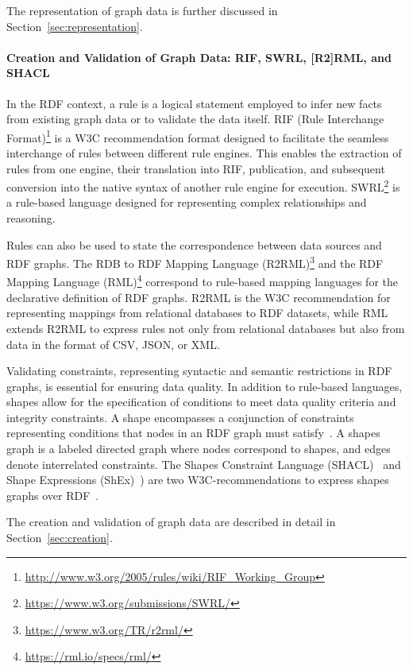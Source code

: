 \documentclass[a4paper,USenglish]{tgdk-v2021}
\newcommand{\myurl}[1]{\footnote{\url{#1}}}
\newcommand{\arxivonly}[1]{}
\begin{document}
The representation of graph data is further discussed in Section~\ref{sec:representation}.

\paragraph*{Creation and Validation of Graph Data: RIF, SWRL, [R2]RML, and SHACL}

In the RDF context, a rule is a logical statement employed to infer new facts from existing graph data or to validate the data itself.
RIF (Rule Interchange Format)\myurl{http://www.w3.org/2005/rules/wiki/RIF_Working_Group} is a W3C recommendation format designed to facilitate the seamless interchange of rules between different rule engines.
This enables the extraction of rules from one engine, their translation into RIF, publication, and subsequent conversion into the native syntax of another rule engine for execution.
SWRL\myurl{https://www.w3.org/submissions/SWRL/} is a rule-based language designed for representing complex relationships 
and reasoning.

Rules can also be used to state the correspondence between data sources and RDF graphs. 
The RDB to RDF Mapping Language (R2RML)\myurl{https://www.w3.org/TR/r2rml/} and the RDF Mapping Language (RML)\myurl{https://rml.io/specs/rml/} correspond to rule-based mapping languages for the declarative definition of RDF graphs. R2RML is the W3C recommendation for representing mappings from relational databases to RDF datasets, while RML extends R2RML to express rules not only from relational databases but also from data in the format of CSV, JSON, or XML.

Validating constraints, representing syntactic and semantic restrictions in RDF graphs, is essential for ensuring data quality.
In addition to rule-based languages, shapes allow for the specification of conditions to meet data quality criteria and integrity constraints.
A shape encompasses a conjunction of constraints representing conditions that nodes in an RDF graph must satisfy~\cite{DBLP:series/synthesis/2021Hogan}. 
A shapes graph is a labeled directed graph where nodes correspond to shapes, and edges denote interrelated constraints. 
The Shapes Constraint Language (SHACL)~\cite{SHACL} and Shape Expressions (ShEx)~\cite{SHEX}) are two W3C-recommendations  to express shapes graphs over RDF~\cite{DBLP:conf/www/RabbaniLH22}.

The creation and validation of graph data are described in detail in Section~\ref{sec:creation}.
\arxivonly{We introduce OWL and reasoning on graph data below.}
\end{document}
